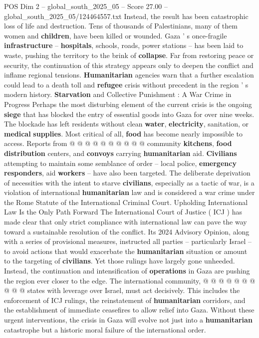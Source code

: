 \begin{textsample}{POS Dim 2 – global\_south\_2025\_05 – Score 27.00 – global\_south\_2025\_05/124464557.txt}
Instead, the result has been catastrophic loss of life and destruction.
Tens of thousands of Palestinians, many of them women and \textbf{children}, have been killed or wounded.
Gaza ' s once-fragile \textbf{infrastructure} -- \textbf{hospitals}, schools, roads, power stations -- has been laid to waste, pushing the territory to the brink of \textbf{collapse}.
Far from restoring peace or security, the continuation of this strategy appears only to deepen the conflict and inflame regional tensions. \textbf{Humanitarian} agencies warn that a further escalation could lead to a death toll and \textbf{refugee} crisis without precedent in the region ' s modern history. \textbf{Starvation} and Collective Punishment : A War Crime in Progress Perhaps the most disturbing element of the current crisis is the ongoing \textbf{siege} that has blocked the entry of essential goods into Gaza for over nine weeks.
The blockade has left residents without clean \textbf{water}, \textbf{electricity}, sanitation, or \textbf{medical} \textbf{supplies}.
Most critical of all, \textbf{food} has become nearly impossible to access.
Reports from @ @ @ @ @ @ @ @ @ @ community \textbf{kitchens}, \textbf{food} \textbf{distribution} centers, and \textbf{convoys} carrying \textbf{humanitarian} aid. \textbf{Civilians} attempting to maintain some semblance of order -- local police, \textbf{emergency} \textbf{responders}, aid \textbf{workers} -- have also been targeted.
The deliberate deprivation of necessities with the intent to starve \textbf{civilians}, especially as a tactic of war, is a violation of international \textbf{humanitarian} law and is considered a war crime under the Rome Statute of the International Criminal Court.
Upholding International Law Is the Only Path Forward The International Court of Justice ( ICJ ) has made clear that only strict compliance with international law can pave the way toward a sustainable resolution of the conflict.
Its 2024 Advisory Opinion, along with a series of provisional measures, instructed all parties -- particularly Israel -- to avoid actions that would exacerbate the \textbf{humanitarian} situation or amount to the targeting of \textbf{civilians}.
Yet those rulings have largely gone unheeded.
Instead, the continuation and intensification of \textbf{operations} in Gaza are pushing the region ever closer to the edge.
The international community, @ @ @ @ @ @ @ @ @ @ states with leverage over Israel, must act decisively.
This includes the enforcement of ICJ rulings, the reinstatement of \textbf{humanitarian} corridors, and the establishment of immediate ceasefires to allow relief into Gaza.
Without these urgent interventions, the crisis in Gaza will evolve not just into a \textbf{humanitarian} catastrophe but a historic moral failure of the international order.

\end{textsample}

